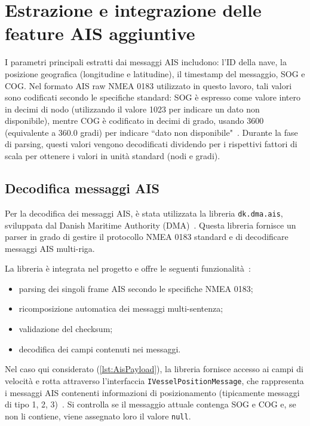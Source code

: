 \section{Estrazione e integrazione delle feature AIS aggiuntive}
\label{sec:estrazione_feature_AIS}

I parametri principali estratti dai messaggi \ac{AIS} includono: l'ID della nave, la posizione geografica (longitudine e latitudine), il timestamp del messaggio, \ac{SOG} e \ac{COG}. Nel formato \ac{AIS} raw NMEA 0183 utilizzato in questo lavoro, tali valori sono codificati secondo le specifiche standard: \ac{SOG} è espresso come valore intero in decimi di nodo (utilizzando il valore 1023 per indicare un dato non disponibile), mentre \ac{COG} è codificato in decimi di grado, usando 3600 (equivalente a 360.0 gradi) per indicare ``dato non disponibile"~\cite{itu_m1371_6}. Durante la fase di parsing, questi valori vengono decodificati dividendo per i rispettivi fattori di scala per ottenere i valori in unità standard (nodi e gradi).

\subsection{Decodifica messaggi AIS}
\label{sec:decodifica_messaggi_AIS}

Per la decodifica dei messaggi \ac{AIS}, è stata utilizzata la libreria \texttt{dk.dma.ais}, sviluppata dal Danish Maritime Authority (DMA)~\cite{dmaAisCore}. Questa libreria fornisce un parser in grado di gestire il protocollo NMEA 0183 standard e di decodificare messaggi \ac{AIS} multi-riga.

La libreria è integrata nel progetto e offre le seguenti funzionalità~\cite{dmaAisCore}:
\begin{itemize}
    \item parsing dei singoli frame \ac{AIS} secondo le specifiche NMEA 0183;
    \item ricomposizione automatica dei messaggi multi-sentenza;
    \item validazione del checksum;
    \item decodifica dei campi contenuti nei messaggi.
\end{itemize}

Nel caso qui considerato (\cref{lst:AisPayload}), la libreria fornisce accesso ai campi di velocità e rotta attraverso l'interfaccia \texttt{IVesselPositionMessage}, che rappresenta i messaggi \ac{AIS} contenenti informazioni di posizionamento (tipicamente messaggi di tipo 1, 2, 3)~\cite{dmaAisCore}. Si controlla se il messaggio attuale contenga \ac{SOG} e \ac{COG} e, se non li contiene, viene assegnato loro il valore \texttt{null}.

